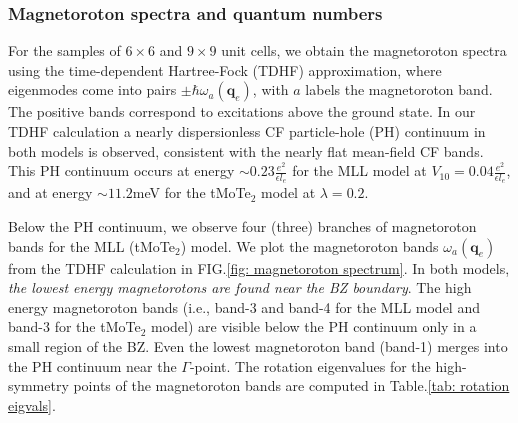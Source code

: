 \subsubsection{Magnetoroton spectra and quantum numbers}
For the samples of $6\times 6$ and $9\times9$ unit cells, we obtain the magnetoroton spectra using the time-dependent Hartree-Fock (TDHF) approximation, where eigenmodes come into pairs $\pm\hbar\omega_a(\mathbf q_e)$, with $a$ labels the magnetoroton band. The positive bands correspond to excitations above the ground state. In our TDHF calculation a nearly dispersionless CF particle-hole (PH) continuum in both models is observed, consistent with the nearly flat mean-field CF bands. This PH continuum occurs at energy $\sim 0.23 \frac{e^2}{\epsilon l_e}$ for the MLL model at $V_{10}=0.04 \frac{e^2}{\epsilon l_e}$, and at energy $\sim 11.2$meV for the tMoTe$_2$ model at $\lambda=0.2$.

Below the PH continuum, we observe four (three) branches of magnetoroton bands for the MLL (tMoTe$_2$) model. We plot the magnetoroton bands $\omega_a(\mathbf q_e)$ from the TDHF calculation in FIG.\ref{fig: magnetoroton spectrum}. In both models, \emph{the lowest energy magnetorotons are found near the BZ boundary}. The high energy magnetoroton bands (i.e., band-3 and band-4 for the MLL model and band-3 for the tMoTe$_2$ model) are visible below the PH continuum only in a small region of the BZ. Even the lowest magnetoroton band (band-1) merges into the PH continuum near the $\Gamma$-point. The rotation eigenvalues for the high-symmetry points of the magnetoroton bands are computed in Table.\ref{tab: rotation eigvals}.


